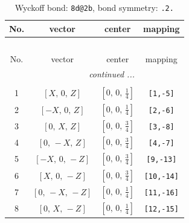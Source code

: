 \documentclass[fleqn,8pt]{jsarticle}
\begin{document}
\renewcommand{\arraystretch}{1.2}
\begin{longtable}{cccc}
\caption{Wyckoff bond: {\tt 8d@2b}, bond symmetry: {\tt .2.}}
 \\
 \hline \hline
No. & vector & center & mapping \\ \hline \endfirsthead

\multicolumn{3}{l}{\tablename\ \thetable{}} \\
 \hline \hline
No. & vector & center & mapping \\ \hline \endhead

 \hline \hline
\multicolumn{3}{r}{\footnotesize\it continued ...} \\ \endfoot

 \hline \hline
\multicolumn{3}{r}{} \\ \endlastfoot

1 & $\left[ X,\, 0,\, Z \right]$ & $\left[ 0,\, 0,\, \frac{1}{4} \right]$ & {\tt [1,-5]} \\ \hline
2 & $\left[ - X,\, 0,\, Z \right]$ & $\left[ 0,\, 0,\, \frac{1}{4} \right]$ & {\tt [2,-6]} \\ \hline
3 & $\left[ 0,\, X,\, Z \right]$ & $\left[ 0,\, 0,\, \frac{3}{4} \right]$ & {\tt [3,-8]} \\ \hline
4 & $\left[ 0,\, - X,\, Z \right]$ & $\left[ 0,\, 0,\, \frac{3}{4} \right]$ & {\tt [4,-7]} \\ \hline
5 & $\left[ - X,\, 0,\, - Z \right]$ & $\left[ 0,\, 0,\, \frac{3}{4} \right]$ & {\tt [9,-13]} \\ \hline
6 & $\left[ X,\, 0,\, - Z \right]$ & $\left[ 0,\, 0,\, \frac{3}{4} \right]$ & {\tt [10,-14]} \\ \hline
7 & $\left[ 0,\, - X,\, - Z \right]$ & $\left[ 0,\, 0,\, \frac{1}{4} \right]$ & {\tt [11,-16]} \\ \hline
8 & $\left[ 0,\, X,\, - Z \right]$ & $\left[ 0,\, 0,\, \frac{1}{4} \right]$ & {\tt [12,-15]} \\
\end{longtable}
\renewcommand{\arraystretch}{1.2}
\end{document}
